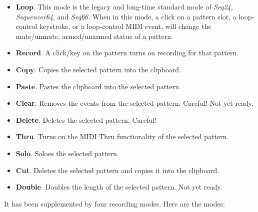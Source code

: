    \begin{itemize}
      \item \textbf{Loop}.
         This mode is the legacy and long-time standard mode of
         \textsl{Seq24}, \textsl{Sequencer64}, and \textsl{Seq66}.
         When in this mode, a click on a pattern slot, a loop-control
         keystroke, or a loop-control MIDI event, will change the mute/unmute,
         armed/unarmed status of a pattern.
      \item \textbf{Record}.
         A click/key on the pattern turns on recording for that pattern.
      \item \textbf{Copy}.
         Copies the selected pattern into the clipboard.
      \item \textbf{Paste}.
         Pastes the clipboard into the selected pattern.
      \item \textbf{Clear}.
         Removes the events from the selected pattern.  Careful!
         Not yet ready.
      \item \textbf{Delete}.
         Deletes the selected pattern.  Careful!
      \item \textbf{Thru}.
         Turns on the MIDI Thru functionality of the selected pattern.
      \item \textbf{Solo}.
         Soloes the selected pattern.
      \item \textbf{Cut}.
         Deletes the selected pattern and copies it into the clipboard.
      \item \textbf{Double}.
         Doubles the length of the selected pattern.
         Not yet ready.
   \end{itemize}
   It has been supplemented by four recording modes.
   Here are the modes:


